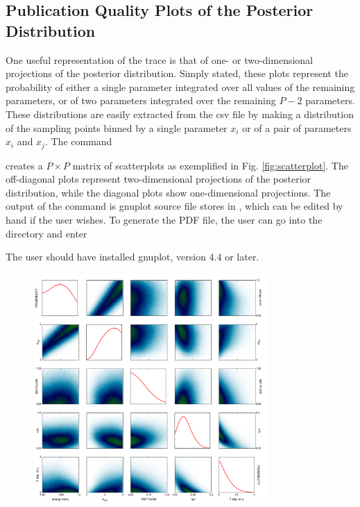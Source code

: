 \subsection{Publication Quality Plots of the Posterior Distribution}

One useful representation of the trace is that of one- or two-dimensional projections of the posterior distribution. Simply stated, these plots represent the probability of either a single parameter integrated over all values of the remaining parameters, or of two parameters integrated over the remaining $P-2$ parameters. These distributions are easily extracted from the csv file by making a distribution of the sampling points binned by a single parameter $x_i$ or of a pair of parameters $x_i$ and $x_j$. The command


creates a $P\times P$ matrix of scatterplots as exemplified in Fig. \ref{fig:scatterplot}. The off-diagonal plots represent two-dimensional projections of the posterior distribution, while the diagonal plots show one-dimensional projections. The output of the command is gnuplot source file stores in , which can be edited by hand if the user wishes. To generate the PDF file, the user can go into the  directory and enter


The user should have installed gnuplot, version 4.4 or later. 

\begin{figure}
\includegraphics[width=0.8\textwidth]{figs/rhic.pdf}
\end{figure}

